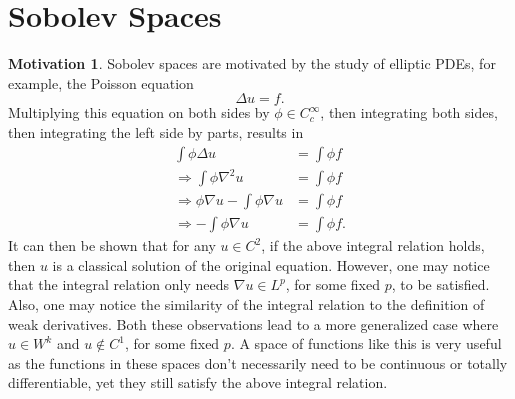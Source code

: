 \documentclass[11pt]{article}
\theoremstyle{definition}
\newtheorem*{motivation}{Motivation}
\begin{document}

\newpage

\section{Sobolev Spaces}
\begin{motivation}
Sobolev spaces are motivated by the study of elliptic PDEs, for example, the Poisson equation
\[\Delta{u} = f.\]
Multiplying this equation on both sides by $\phi \in C_{c}^{\infty}$, then integrating both sides, then integrating the left side by parts, results in
\begin{equation*}
	\begin{aligned}
		\int \phi \Delta u &= \int \phi f \\
		\Rightarrow \int \phi \nabla^2 u &= \int \phi f \\
		\Rightarrow \phi \nabla u - \int \phi \nabla u &= \int \phi f \\ 
		\Rightarrow - \int \phi \nabla u &= \int \phi f.
	\end{aligned}
\end{equation*}
It can then be shown that for any $u \in C^2$, if the above integral relation holds, then $u$ is a classical solution of the original equation.
However, one may notice that the integral relation only needs $\nabla u \in L^p$, for some fixed $p$, to be satisfied.
Also, one may notice the similarity of the integral relation to the definition of weak derivatives. Both these observations lead to a more generalized
case where $u \in W^k$ and $u \not\in C^1$, for some fixed $p$.
A space of functions like this is very useful as the functions in these spaces don't necessarily need to be continuous or totally differentiable,
yet they still satisfy the above integral relation. 
\end{motivation}
\end{document}
